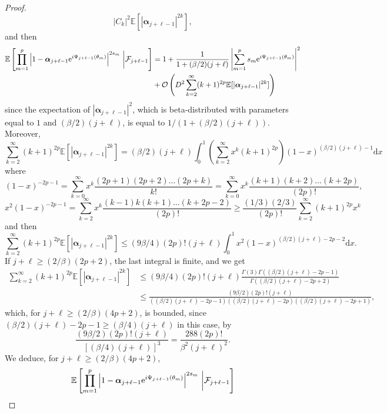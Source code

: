 \documentclass[10pt,a4paper]{amsart}
\begin{document}
\begin{proof}
$$|C_k|^2 \mathbb{E}[ |\boldsymbol{\alpha}_{j+\ell-1} |^{2k} ],$$
and then 
\begin{align*}\mathbb{E} \left[ \prod_{m=1}^p \left| 1 -  \boldsymbol{\alpha}_{j+\ell-1} \mathrm{e}^{\textnormal{i} \Psi_{j+ \ell - 1} (\theta_m) }\right|^{2s_m} \, \bigg| \mathcal{F}_{j+ \ell-1} \right] 
& = 1 + \frac{1}{ 1 + (\beta/2)(j+\ell)} \left|\sum_{m=1}^{p} s_m \mathrm{e}^{\textnormal{i} \Psi_{j+ \ell - 1} (\theta_m) }\right|^2
\\ & + \mathcal{O} \left( D^2 \sum_{k=2}^{\infty}
(k+1)^{2p} \mathbb{E}[ |\boldsymbol{\alpha}_{j+\ell-1} |^{2k}]
\right)
\end{align*}
since the expectation of 
$|\boldsymbol{\alpha}_{j+\ell-1}|^2$, which is beta-distributed with parameters equal to $1$ and $(\beta/2)(j+\ell)$, is equal to $1/ (1 + (\beta/2)(j+\ell))$. 
Moreover, 
$$\sum_{k=2}^{\infty} (k+1)^{2p}
 \mathbb{E}[ |\boldsymbol{\alpha}_{j+\ell-1} |^{2k}]
 = (\beta/2)(j+\ell) 
 \int_0^1 \left(\sum_{k = 2}^{\infty} x^k (k+1)^{2p}\right)  (1-x)^{(\beta/2)(j+\ell)  - 1}  \mathrm{d}x
$$
where 
$$(1-x)^{-2p-1}
= \sum_{k=0}^{\infty} x^k
\frac{(2p+1)(2p+2) \dots (2p+k)}{k!}
= \sum_{k=0}^{\infty} x^k
\frac{(k+1)(k+2) \dots (k+2p)}{(2p)!},
$$
$$x^2 (1-x)^{-2p-1} = 
\sum_{k=2}^{\infty} x^k
\frac{(k-1)k(k+1) \dots (k+2p-2)}{(2p)!}
\geq \frac{(1/3)(2/3)}{(2p)!}
\sum_{k=2}^{\infty} (k+1)^{2p} x^k
$$
and then
$$\sum_{k=2}^{\infty} (k+1)^{2p}
 \mathbb{E}[ |\boldsymbol{\alpha}_{j+\ell-1} |^{2k}]
 \leq (9 \beta/4) (2p)! (j+\ell) 
 \int_0^{1} x^2 (1 - x)^{(\beta/2)(j+\ell) - 2p-2} \mathrm{d}x.
 $$
If $j + \ell \geq (2/\beta)(2p+2)$, the last integral is finite, and 
we get 
\begin{align*}\sum_{k=2}^{\infty} (k+1)^{2p}
 \mathbb{E}[ |\boldsymbol{\alpha}_{j+\ell-1} |^{2k}]
 & \leq (9 \beta/4) (2p)! (j+\ell)  
 \frac{ \Gamma(3) \Gamma((\beta/2)(j+\ell) - 2p - 1)}{\Gamma((\beta/2)(j+\ell) - 2p +2 )}
 \\ & \leq \frac{ (9 \beta/2) (2p)! (j+\ell)}{
 ((\beta/2)(j+\ell) - 2p -1 )
 ((\beta/2)(j+\ell) - 2p  )((\beta/2)(j+\ell) - 2p +1 )},
 \end{align*}
which, for $j+\ell \geq (2/\beta)(4p + 2)$, 
is bounded, since $(\beta/2)(j+\ell) - 2p-1
\geq (\beta/4)(j+\ell)$ in this case, by
$$\frac{ (9 \beta/2) (2p)! (j+\ell)}{
 [(\beta/4)(j+\ell)]^3 }
 = \frac{288 (2p)!}{\beta^2 (j+\ell)^2}.$$
We deduce, 
for $j+\ell \geq (2/\beta)(4p+2)$, 
\begin{align*}\mathbb{E} \left[ \prod_{m=1}^p \left| 1 -  \boldsymbol{\alpha}_{j+\ell-1} \mathrm{e}^{\textnormal{i} \Psi_{j+ \ell - 1} (\theta_m) }\right|^{2s_m} \, \bigg| \mathcal{F}_{j+ \ell-1} \right] 

\end{align*}
\end{proof}
\end{document}

